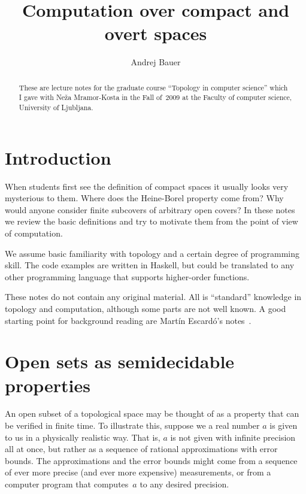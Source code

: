 \documentclass[a4paper,10pt]{article}
\begin{document}
\title{Computation over compact and overt spaces}
\author{Andrej Bauer}

\maketitle

\begin{abstract}
    These are lecture notes for the graduate course ``Topology in computer
    science'' which I gave with Neža Mramor-Kosta in the Fall of~2009 at the
    Faculty of computer science, University of Ljubljana.
\end{abstract}

\section{Introduction}
\label{sec:introduction}

When students first see the definition of compact spaces it usually looks very
mysterious to them. Where does the Heine-Borel property come from? Why would
anyone consider finite subcovers of arbitrary open covers? In these notes we
review the basic definitions and try to motivate them from the point of view
of computation.

We assume basic familiarity with topology and a certain degree of programming
skill. The code examples are written in Haskell, but could be translated to
any other programming language that supports higher-order functions.

These notes do not contain any original material. All is ``standard''
knowledge in topology and computation, although some parts are not well known.
A good starting point for background reading are Martín Escardó's
notes~\cite{escardo04:_synth}.

\section{Open sets as semidecidable properties}
\label{sec:opens-semidecidable}

An open subset of a topological space may be thought of as a property that can
be verified in finite time. To illustrate this, suppose we a real number $a$
is given to us in a physically realistic way. That is, $a$ is not given with
infinite precision all at once, but rather as a sequence of rational
approximations with error bounds. The approximations and the error bounds
might come from a sequence of ever more precise (and ever more expensive)
measurements, or from a computer program that computes~$a$ to any desired
precision.
\end{document}
